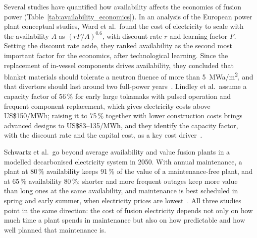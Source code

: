 \documentclass{book}
\begin{document}
Several studies have quantified how availability affects the economics of
fusion power (Table~\ref{tab:availability_economics}). In an analysis
of the European power plant conceptual studies, Ward et al.\ found the cost of
electricity to scale with the availability $A$ as $(rF/A)^{0.6}$, with
discount rate $r$ and learning factor $F$. Setting the discount rate aside, they
ranked availability as the second most important factor for the economics,
after technological learning. Since the
replacement of in-vessel components drives availability, they concluded that
blanket materials should tolerate a neutron fluence of more than
\SI{5}{MWa/m^2}, and that divertors should last around two full-power
years~\cite{ward2005economic}. Lindley et al.\ assume a capacity factor of
56\,\% for early large tokamaks with pulsed operation and frequent component
replacement, which gives electricity costs above US\$150/MWh; raising it to
75\,\% together with lower construction costs brings advanced designs to
US\$83--135/MWh, and they identify the capacity factor, with the discount rate
and the capital cost, as a key cost driver~\cite{Lindley2023}.

Schwartz et al.\ go beyond average availability and value fusion plants in a
modelled decarbonised electricity system in 2050. With annual maintenance, a
plant at 80\,\% availability keeps 91\,\% of the value of a maintenance-free
plant, and at 65\,\% availability 80\,\%; shorter and more frequent outages
keep more value than long ones at the same availability, and maintenance is
best scheduled in spring and early summer, when electricity prices are
lowest~\cite{schwartz2024maintenance}. All three studies point in the same
direction: the cost of fusion electricity depends not only on how much time a
plant spends in maintenance but also on how predictable and how well planned
that maintenance is.
\end{document}
